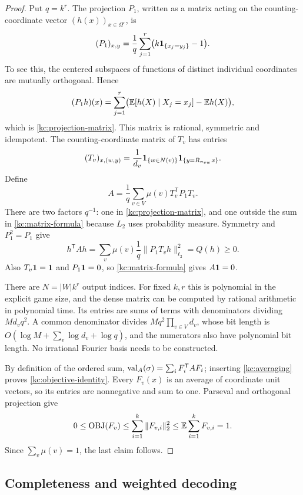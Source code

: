 \begin{proof}
Put \(q=k^r\). The projection \(P_1\), written as a matrix acting
on the counting-coordinate vector \((h(x))_{x\in\Omega^r}\), is
\begin{equation}\label{kc:projection-matrix}
 (P_1)_{x,y}=\frac1q
       \sum_{j=1}^r\bigl(k\mathbf 1_{\{x_j=y_j\}}-1\bigr).
\end{equation}
To see this, the centered subspaces of functions of distinct
individual coordinates are mutually orthogonal. Hence
\[
 (P_1h)(x)=
 \sum_{j=1}^r\bigl(\mathbb E[h(X)\mid X_j=x_j]-\mathbb E h(X)\bigr),
\]
which is \eqref{kc:projection-matrix}.
This matrix is rational, symmetric and idempotent.
The counting-coordinate matrix of \(T_v\) has entries
\[
 (T_v)_{x,(w,y)}
 =\frac1{d_v}\mathbf 1_{\{w\in N(v)\}}
           \mathbf 1_{\{y=R_{\pi_{vw}}x\}} .
\]
Define
\begin{equation}\label{kc:matrix-formula}
 A=\frac1q\sum_{v\in V}\mu(v)T_v^{\mathsf T}P_1T_v.
\end{equation}
There are two factors \(q^{-1}\): one in
\eqref{kc:projection-matrix}, and one outside the sum in
\eqref{kc:matrix-formula} because \(L_2\) uses probability
measure. Symmetry and \(P_1^2=P_1\) give
\[
 h^{\mathsf T}Ah
 =\sum_v\mu(v)\frac1q\|P_1T_vh\|_{\ell_2}^2=Q(h)\ge0.
\]
Also \(T_v\mathbf 1=\mathbf 1\) and \(P_1\mathbf 1=0\), so
\eqref{kc:matrix-formula} gives \(A\mathbf 1=0\).

There are \(N=|W|k^r\) output indices. For fixed \(k,r\) this is
polynomial in the explicit game size, and the dense matrix can be
computed by rational arithmetic in polynomial time. Its entries
are sums of terms with denominators dividing
\(M d_v q^2\). A common denominator divides
\(M q^2\prod_{v\in V}d_v\), whose bit length is
\(O(\log M+\sum_v\log d_v+\log q)\), and the numerators also
have polynomial bit length. No irrational Fourier basis needs
to be constructed.

By definition of the ordered sum,
\(\operatorname{val}_A(\sigma)=\sum_iF_i^{\mathsf T}AF_i\); inserting
\eqref{kc:averaging} proves \eqref{kc:objective-identity}.
Every \(F_v(x)\) is an average of coordinate unit vectors, so
its entries are nonnegative and sum to one. Parseval and
orthogonal projection give
\begin{equation}\label{kc:objective-bound}
 0\le\operatorname{OBJ}(F_v)
 \le\sum_{i=1}^k\|F_{v,i}\|_2^2
 \le\mathbb E\sum_{i=1}^k F_{v,i}=1.
\end{equation}
Since \(\sum_v\mu(v)=1\), the last claim follows.
\end{proof}

\subsection{Completeness and weighted decoding}

